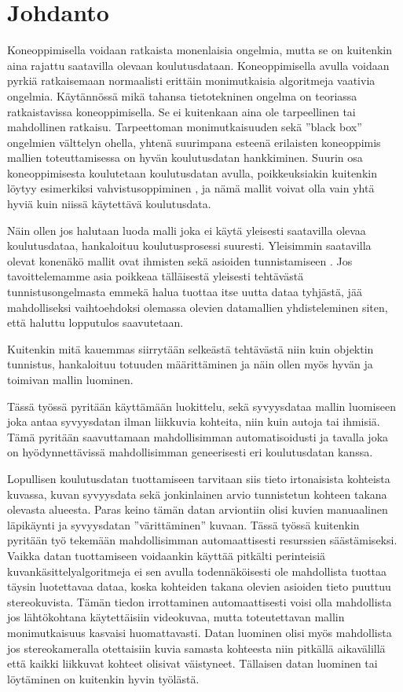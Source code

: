 \chapter{Johdanto}%
\label{ch:johdanto}

Koneoppimisella voidaan ratkaista monenlaisia ongelmia, mutta se on kuitenkin aina rajattu saatavilla olevaan koulutusdataan.
Koneoppimisella avulla voidaan pyrkiä ratkaisemaan normaalisti erittäin monimutkaisia algoritmeja vaativia ongelmia.
Käytännössä mikä tahansa tietotekninen ongelma on teoriassa ratkaistavissa koneoppimisella.
Se ei kuitenkaan aina ole tarpeellinen tai mahdollinen ratkaisu.
Tarpeettoman monimutkaisuuden sekä ”black box” ongelmien välttelyn ohella,
yhtenä suurimpana esteenä erilaisten koneoppimis mallien toteuttamisessa on hyvän koulutusdatan hankkiminen.
Suurin osa koneoppimisesta koulutetaan koulutusdatan avulla, poikkeuksiakin kuitenkin löytyy esimerkiksi vahvistusoppiminen \cite{alma9911523590705973},
ja nämä mallit voivat olla vain yhtä hyviä kuin niissä käytettävä koulutusdata.

Näin ollen jos halutaan luoda malli joka ei käytä yleisesti saatavilla olevaa koulutusdataa,
hankaloituu koulutusprosessi suuresti.
Yleisimmin saatavilla olevat konenäkö mallit ovat ihmisten sekä asioiden tunnistamiseen \cite{kagglecomvis}.
Jos tavoittelemamme asia poikkeaa tälläisestä yleisesti tehtävästä tunnistusongelmasta
emmekä halua tuottaa itse uutta dataa tyhjästä,
jää mahdolliseksi vaihtoehdoksi olemassa olevien datamallien yhdisteleminen siten,
että haluttu lopputulos saavutetaan.

Kuitenkin mitä kauemmas siirrytään selkeästä tehtävästä niin kuin objektin tunnistus,
hankaloituu totuuden määrittäminen ja näin ollen myös hyvän ja toimivan mallin luominen.

Tässä työssä pyritään käyttämään luokittelu, sekä syvyysdataa mallin luomiseen joka antaa syvyysdatan
ilman liikkuvia kohteita, niin kuin autoja tai ihmisiä.
Tämä pyritään saavuttamaan mahdollisimman automatisoidusti
ja tavalla joka on hyödynnettävissä mahdollisimman geneerisesti eri koulutusdatan kanssa.

Lopullisen koulutusdatan tuottamiseen tarvitaan siis tieto irtonaisista kohteista kuvassa,
kuvan syvyysdata sekä jonkinlainen arvio tunnistetun kohteen takana olevasta alueesta.
Paras keino tämän datan arviontiin olisi kuvien manuaalinen läpikäynti ja syvyysdatan ”värittäminen” kuvaan.
Tässä työssä kuitenkin pyritään työ tekemään mahdollisimman automaattisesti resurssien säästämiseksi.
Vaikka datan tuottamiseen voidaankin käyttää pitkälti perinteisiä kuvankäsittelyalgoritmeja
ei sen avulla todennäköisesti ole mahdollista tuottaa täysin luotettavaa dataa,
koska kohteiden takana olevien asioiden tieto puuttuu stereokuvista.
Tämän tiedon irrottaminen automaattisesti voisi olla mahdollista jos lähtökohtana käytettäisiin videokuvaa,
mutta toteutettavan mallin monimutkaisuus kasvaisi huomattavasti.
Datan luominen olisi myös mahdollista jos stereokameralla otettaisiin kuvia samasta kohteesta niin pitkällä aikavälillä että kaikki liikkuvat kohteet olisivat väistyneet.
Tällaisen datan luominen tai löytäminen on kuitenkin hyvin työlästä. 

